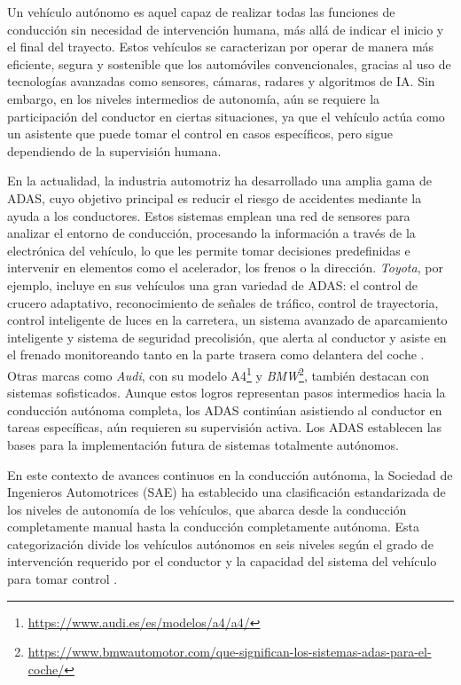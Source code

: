 Un vehículo autónomo es aquel capaz de realizar todas las funciones de conducción sin necesidad de intervención humana, más allá de indicar el inicio y el final del trayecto. Estos vehículos se caracterizan por operar de manera más eficiente, segura y sostenible que los automóviles convencionales, gracias al uso de tecnologías avanzadas como sensores, cámaras, radares y algoritmos de \ac{IA}. Sin embargo, en los niveles intermedios de autonomía, aún se requiere la participación del conductor en ciertas situaciones, ya que el vehículo actúa como un asistente que puede tomar el control en casos específicos, pero sigue dependiendo de la supervisión humana.

En la actualidad, la industria automotriz ha desarrollado una amplia gama de \ac{ADAS}, cuyo objetivo principal es reducir el riesgo de accidentes mediante la ayuda a los conductores. Estos sistemas emplean una red de sensores para analizar el entorno de conducción, procesando la información a través de la electrónica del vehículo, lo que les permite tomar decisiones predefinidas e intervenir en elementos como el acelerador, los frenos o la dirección. \textit{Toyota}, por ejemplo, incluye en sus vehículos una gran variedad de \ac{ADAS}: el control de crucero adaptativo, reconocimiento de señales de tráfico, control de trayectoria, control inteligente de luces en la carretera, un sistema avanzado de aparcamiento inteligente y sistema de seguridad precolisión, que alerta al conductor y asiste en el frenado monitoreando tanto en la parte trasera como delantera del coche \cite{toyota-assist}. Otras marcas como \textit{Audi}, con su modelo A4\footnote{\url{https://www.audi.es/es/modelos/a4/a4/}} y \textit{BMW}\footnote{\url{https://www.bmwautomotor.com/que-significan-los-sistemas-adas-para-el-coche/}}, también destacan con sistemas sofisticados. Aunque estos logros representan pasos intermedios hacia la conducción autónoma completa, los \ac{ADAS} continúan asistiendo al conductor en tareas específicas, aún requieren su supervisión activa. Los \ac{ADAS} establecen las bases para la implementación futura de sistemas totalmente autónomos. 

En este contexto de avances continuos en la conducción autónoma, la Sociedad de Ingenieros Automotrices (\ac{SAE}) ha establecido una clasificación estandarizada de los niveles de autonomía de los vehículos, que abarca desde la conducción completamente manual hasta la conducción completamente autónoma. Esta categorización divide los vehículos autónomos en seis niveles según el grado de intervención requerido por el conductor y la capacidad del sistema del vehículo para tomar control \cite{autobild-autonomous}.

